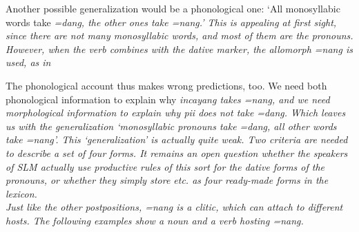 Another possible generalization would be a phonological one: `All monosyllabic words take \em =dang\em, the other ones take  \em =nang\em.' This is appealing at first sight, since there are not many monosyllabic words, and most of them are the pronouns. However, when the verb  combines with the dative marker, the allomorph \em =nang \em is used, as in 


The phonological account thus  makes wrong predictions, too. We need both phonological information to explain why \em incayang \em takes \em =nang\em, and we need morphological information to explain why \em pii \em does not take \em =dang\em. Which leaves us with the generalization `monosyllabic pronouns take \em =dang\em, all other words take \em =nang\em'. This `generalization' is actually quite weak. Two criteria are needed to describe a set of four forms. It remains an open question whether the speakers of SLM actually use productive rules of this sort for the dative forms of the pronouns, or whether they simply store  etc. as  four ready-made forms in the lexicon.\\

Just like the other postpositions, \em =nang \em is a clitic, which can attach to different hosts. The following examples show a noun  and a verb  hosting \em =nang\em.
 
 


